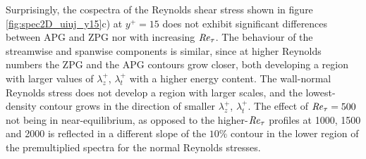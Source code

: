 Surprisingly, the cospectra of the Reynolds shear stress shown in figure \ref{fig:spec2D_uiuj_y15}c) at $y^+=15$ does not exhibit significant differences between APG and ZPG nor with increasing $\mbox{\textit{Re}}_{\tau}$. 
The behaviour of the streamwise and spanwise components is similar, since at higher Reynolds numbers the ZPG and the APG contours grow closer, both developing a region with larger values of $\lambda_z^+$, $\lambda_t^+$ with a higher energy content.
The wall-normal Reynolds stress does not develop a region with larger scales, and the lowest-density contour grows in the direction of smaller $\lambda_z^+$, $\lambda_t^+$.
The effect of $\mbox{\textit{Re}}_{\tau}=500$ not being in near-equilibrium, as opposed to the higher-$\mbox{\textit{Re}}_{\tau}$ profiles at 1000, 1500 and 2000 is reflected in a different slope of the $10\%$ contour in the lower region of the premultiplied spectra for the normal Reynolds stresses.



